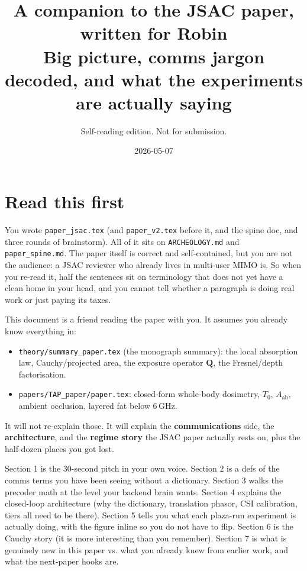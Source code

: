 \documentclass[11pt]{article}
\title{\textbf{A companion to the JSAC paper, written for Robin}\\[2pt]
\large{Big picture, comms jargon decoded, and what the experiments are actually saying}}
\author{Self-reading edition. Not for submission.}
\date{2026-05-07}
\newcommand{\Aab}{A_{\mathrm{ab}}}
\newcommand{\Qmat}{\mathbf{Q}}
\begin{document}
\maketitle

\section*{Read this first}

You wrote \texttt{paper\_jsac.tex} (and \texttt{paper\_v2.tex} before it,
and the spine doc, and three rounds of brainstorm). All of it sits on
\texttt{ARCHEOLOGY.md} and \texttt{paper\_spine.md}. The paper itself is
correct and self-contained, but you are not the audience: a JSAC reviewer
who already lives in multi-user MIMO is. So when you re-read it, half
the sentences sit on terminology that does not yet have a clean home in
your head, and you cannot tell whether a paragraph is doing real work or
just paying its taxes.

This document is a friend reading the paper with you. It assumes you
already know everything in:
\begin{itemize}[leftmargin=1.4em,itemsep=2pt]
  \item \texttt{theory/summary\_paper.tex} (the monograph summary): the
  local absorption law, Cauchy/projected area, the exposure operator
  $\Qmat$, the Fresnel/depth factorisation.
  \item \texttt{papers/TAP\_paper/paper.tex}: closed-form whole-body
  dosimetry, $T_0$, $\Aab$, ambient occlusion, layered fat below 6\,GHz.
\end{itemize}
It will not re-explain those. It will explain the \textbf{communications}
side, the \textbf{architecture}, and the \textbf{regime story} the JSAC
paper actually rests on, plus the half-dozen places you got lost.

Section 1 is the $30$-second pitch in your own voice.
Section 2 is a defs of the comms terms you have been seeing without a
dictionary. Section 3 walks the precoder math at the level your
backend brain wants. Section 4 explains the closed-loop architecture
(why the dictionary, translation phasor, CSI calibration, tiers all
need to be there). Section 5 tells you what each plaza-run experiment
is actually doing, with the figure inline so you do not have to flip.
Section 6 is the Cauchy story (it is more interesting than you remember).
Section 7 is what is genuinely new in this paper vs. what you already
knew from earlier work, and what the next-paper hooks are.
\end{document}

